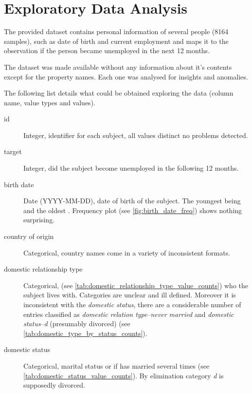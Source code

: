 \section{Exploratory Data Analysis}
\label{sec:eda}

The provided dataset contains personal information of several people
(8164 samples), such as date of birth and current employment and maps
it to the observation if the person became unemployed in the next 12 months.

The dataset was made available without any information about it's contents
except for the property names.
Each one was analysed for insights and anomalies.

The following list details what could be obtained exploring the data
(column name, value types and values).

\begin{description}
\item [id] Integer, identifier for each subject, all values distinct no
    problems detected.

\item [target] Integer, did the subject become unemployed in the following
    12 months.

\item [birth date] Date (YYYY-MM-DD), date of birth of the subject.
    The youngest being  and the oldest
    .
    Frequency plot (see \vref{fig:birth_date_freq}) shows nothing surprising.

\item [country of origin] Categorical, country names come in a variety of
    inconsistent formats.

\item [domestic relationship type] Categorical,
    (see \vref{tab:domestic_relationship_type_value_counts}) who the subject
    lives with.
    Categories are unclear and ill defined.
    Moreover it is inconsistent with the \emph{domestic status}, there are a
    considerable number of entries classified as
    \emph{domestic relation type}--\emph{never married} and
    \emph{domestic status}--\emph{d} (presumably divorced)
    (see \vref{tab:domestic_type_by_status_counts}).

\item [domestic status] Categorical, marital status or if has married several
    times (see \vref{tab:domestic_status_value_counts}).
    By elimination category \emph{d} is supposedly divorced.


\end{description}
